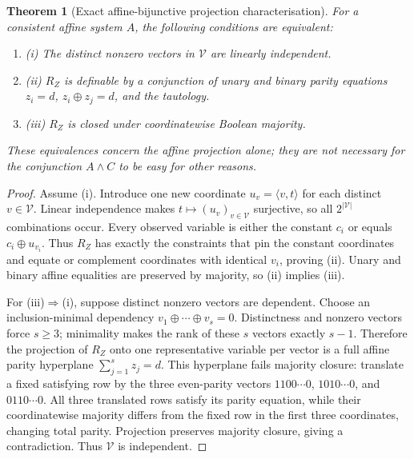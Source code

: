 \documentclass[11pt]{article}
\newtheorem{theorem}{Theorem}
\begin{document}
\begin{theorem}[Exact affine-bijunctive projection characterisation]
\label{thm:char}
For a consistent affine system $A$, the following conditions are equivalent:
\begin{enumerate}
\item[] (i) The distinct nonzero vectors in $\mathcal V$ are linearly independent.
\item[] (ii) $R_Z$ is definable by a conjunction of unary and binary
parity equations $z_i=d$, $z_i\oplus z_j=d$, and the tautology.
\item[] (iii) $R_Z$ is closed under coordinatewise Boolean majority.
\end{enumerate}
These equivalences concern the \emph{affine projection alone}; they are not
necessary for the conjunction $A\wedge C$ to be easy for other reasons.
\end{theorem}
\begin{proof}
Assume (i). Introduce one new coordinate $u_v=\langle v,t\rangle$
for each distinct $v\in\mathcal V$. Linear independence makes
$t\mapsto(u_v)_{v\in\mathcal V}$ surjective, so all $2^{|\mathcal V|}$
combinations occur. Every observed variable is either the constant $c_i$
or equals $c_i\oplus u_{v_i}$. Thus $R_Z$ has exactly the constraints that
pin the constant coordinates and equate or complement coordinates with
identical $v_i$, proving (ii). Unary and binary affine equalities are
preserved by majority, so (ii) implies (iii).

For (iii)$\Rightarrow$(i), suppose distinct nonzero vectors are dependent.
Choose an inclusion-minimal dependency $v_1\oplus\cdots\oplus v_s=0$.
Distinctness and nonzero vectors force $s\ge3$; minimality makes the rank
of these $s$ vectors exactly $s-1$. Therefore the projection of $R_Z$
onto one representative variable per vector is a full affine parity
hyperplane $\sum_{j=1}^s z_j=d$. This hyperplane fails majority closure:
translate a fixed satisfying row by the three even-parity vectors
$1100\cdots0$, $1010\cdots0$, and $0110\cdots0$. All three translated
rows satisfy its parity equation, while their coordinatewise majority
differs from the fixed row in the first three coordinates, changing total
parity. Projection preserves majority closure, giving a contradiction.
Thus $\mathcal V$ is independent.
\end{proof}
\end{document}
